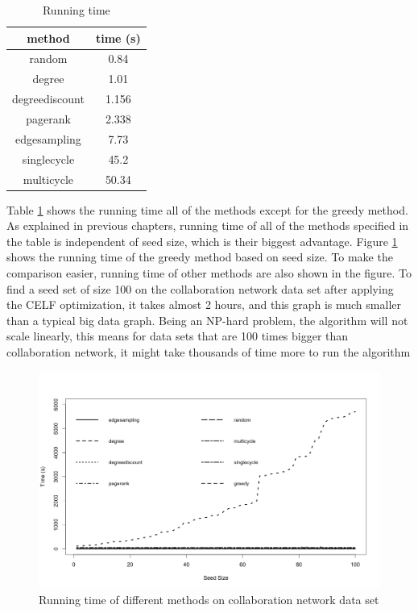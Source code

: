 \documentclass[english]{tktltiki}
\begin{document}
\begin{table}[ht!]
\centering
\begin{tabular}{ |c|c| }
\hline 
  method & time (s)\\
  \hline 
  random & 0.84\\
  degree & 1.01\\
  degreediscount&1.156\\
  pagerank&2.338\\
  edgesampling&7.73\\
  singlecycle&45.2\\
  multicycle&50.34\\
  \hline 
\end{tabular}
\caption{Running time}
\label{hep:timetable}
\end{table}
Table \ref{hep:timetable} shows the running time all of the methods except for the greedy method. 
As explained in previous chapters, running time of all of the methods specified in the table is independent of seed size, which is their biggest advantage. 
Figure \ref{hep:times} shows the running time of the greedy method based on seed size. 
To make the comparison easier, running time of other methods are also shown in the figure. 
To find a seed set of size 100 on the collaboration network data set after applying the CELF optimization, it takes almost 2 hours, and this graph is much smaller than a typical big data graph. 
Being an NP-hard problem, the algorithm will not scale linearly, this means for data sets that are 100 times bigger than collaboration network, it might take thousands of time more to run the algorithm
\begin{figure}[H]
\centering
\includegraphics[width=150mm]{figures/hep/times.png}
\caption{Running time of different methods on collaboration network data set}
\label{hep:times}
\end{figure}
\end{document}
